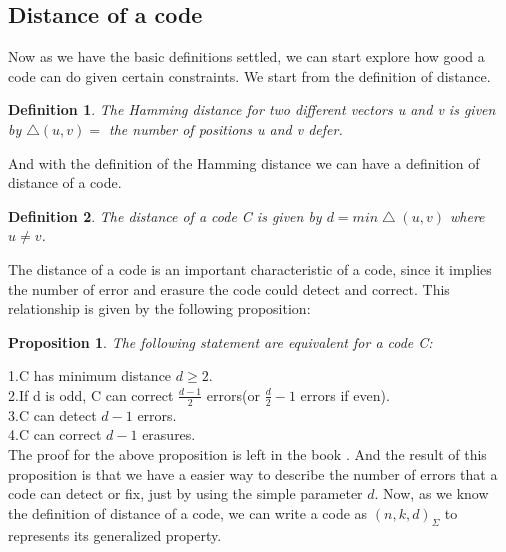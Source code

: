\documentclass{article}
\newtheorem{Definition}{Definition}
\newtheorem{Proposition}{Proposition}
\begin{document}
\subsection{Distance of a code}
Now as we have the basic definitions settled, we can start explore how good a code can do given certain constraints. We start from the definition of distance.
\begin{Definition}The Hamming distance for two different vectors u and v is given by $\bigtriangleup(u,v) = $ the number of positions u and v defer.
\end{Definition}
\noindent And with the definition of the Hamming distance we can have a definition of distance of a code.
\begin{Definition}
The distance of a code C is given by $d = min \bigtriangleup (u,v)$ where $u \neq v$.
\end{Definition}
The distance of a code is an important characteristic of a code, since it implies the number of error and erasure the code could detect and correct. This relationship is given by the following proposition:
\begin{Proposition}The following statement are equivalent for a code C:\end{Proposition}
1.C has minimum distance $d \ge 2$.\\
\indent 2.If d is odd, C can correct $\frac{d-1}{2}$ errors(or $\frac{d}{2}-1$ errors if even).\\
\indent 3.C can detect $d-1$ errors.\\
\indent 4.C can correct $d-1$ erasures.\\
The proof for the above proposition is left in the book \cite{book}. And the result of this proposition is that we have a easier way to describe the number of errors that a code can detect or fix, just by using the simple parameter $d$. Now, as we know the definition of distance of a code, we can write a code as $(n,k,d)_\Sigma$ to represents its generalized property.
\end{document}
